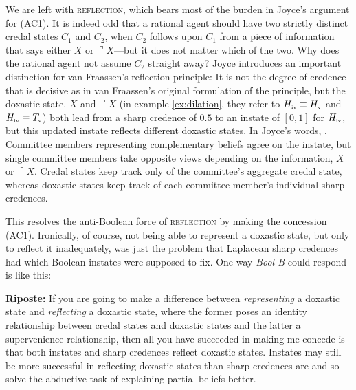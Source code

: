 \documentclass[11pt]{article}
\newcommand{\augustin}[0]{\textit{Bool-B}}
\begin{document}
We are left with \textsc{reflection}, which bears most of the burden
in Joyce's argument for (AC1). It is indeed odd that a rational agent
should have two strictly distinct credal states $C_{1}$ and $C_{2}$,
when $C_{2}$ follows upon $C_{1}$ from a piece of information that
says either $X$ or $\urcorner{}X$---but it does not matter which of
the two. Why does the rational agent not assume $C_{2}$ straight away?
Joyce introduces an important distinction for van Fraassen's
reflection principle: It is not the degree of credence that is
decisive as in van Fraassen's original formulation of the principle,
but the doxastic state. $X$ and $\urcorner{}X$ (in example
\ref{ex:dilation}, they refer to
$H_{\mbox{\tiny{iv}}}\equiv{}H_{\mbox{\tiny{v}}}$ and
$H_{\mbox{\tiny{iv}}}\equiv{}T_{\mbox{\tiny{v}}}$) both lead from a
sharp credence of $0.5$ to an instate of $[0,1]$ for
$H_{\mbox{\tiny{iv}}}$, but this updated instate reflects different
doxastic states. In Joyce's words, 
. Committee members representing complementary
beliefs agree on the instate, but single committee members take
opposite views depending on the information, $X$ or $\urcorner{}X$.
Credal states keep track only of the committee's aggregate credal
state, whereas doxastic states keep track of each committee member's
individual sharp credences.

This resolves the anti-Boolean force of \textsc{reflection} by making
the concession (AC1). Ironically, of course, not being able to
represent a doxastic state, but only to reflect it inadequately, was
just the problem that Laplacean sharp credences had which Boolean
instates were supposed to fix. One way {\augustin} could respond is
like this:

\begin{quotex}
  \textbf{Riposte:} If you are going to make a difference between
  \emph{representing} a doxastic state and \emph{reflecting} a
  doxastic state, where the former poses an identity relationship
  between credal states and doxastic states and the latter a
  supervenience relationship, then all you have succeeded in making me
  concede is that both instates and sharp credences reflect doxastic
  states. Instates may still be more successful in reflecting doxastic
  states than sharp credences are and so solve the abductive task of
  explaining partial beliefs better.
\end{quotex}
\end{document}
